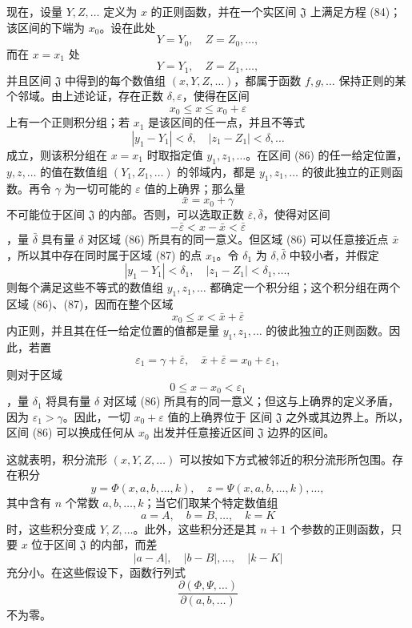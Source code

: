 \documentclass[11pt,a4paper,leqno]{article}
\begin{document}
现在，设量 $Y,Z,\ldots$ 定义为 $x$ 的正则函数，并在一个实区间 $\mathfrak J$ 上满足方程 (84)；该区间的下端为 $x_0$。设在此处
\[
Y=Y_0,\quad Z=Z_0,\ldots,
\]
而在 $x=x_1$ 处
\[
Y=Y_1,\quad Z=Z_1,\ldots,
\]
并且区间 $\mathfrak J$ 中得到的每个数值组 $(x,Y,Z,\ldots)$，都属于函数 $f,g,\ldots$
保持正则的某个邻域。由上述论证，存在正数 $\delta,\varepsilon$，使得在区间
\begin{equation}\tag{86}
x_0\leq x\leq x_0+\varepsilon
\end{equation}
上有一个正则积分组；若 $x_1$ 是该区间的任一点，并且不等式
\[
|y_1-Y_1|<\delta,\quad |z_1-Z_1|<\delta,\ldots
\]
成立，则该积分组在 $x=x_1$ 时取指定值 $y_1,z_1,\ldots$。在区间 (86) 的任一给定位置，$y,z,\ldots$ 的值在数值组 $(Y_1,Z_1,\ldots)$ 的邻域内，都是 $y_1,z_1,\ldots$ 的彼此独立的正则函数。再令 $\gamma$ 为一切可能的 $\varepsilon$ 值的上确界；那么量
\[
\bar x=x_0+\gamma
\]
不可能位于区间 $\mathfrak J$ 的内部。否则，可以选取正数 $\bar\varepsilon,\bar\delta$，使得对区间
\begin{equation}\tag{87}
-\bar\varepsilon<x-\bar x<\bar\varepsilon
\end{equation}
，量 $\bar\delta$ 具有量 $\delta$ 对区域 (86) 所具有的同一意义。但区域 (86) 可以任意接近点 $\bar x$，所以其中存在同时属于区域 (87) 的点 $x_1$。令 $\delta_1$ 为 $\delta,\bar\delta$ 中较小者，并假定
\[
|y_1-Y_1|<\delta_1,\quad |z_1-Z_1|<\delta_1,\ldots,
\]
则每个满足这些不等式的数值组 $y_1,z_1,\ldots$ 都确定一个积分组；这个积分组在两个区域 (86)、(87)，因而在整个区域
\[
x_0\leq x<\bar x+\bar\varepsilon
\]
内正则，并且其在任一给定位置的值都是量 $y_1,z_1,\ldots$ 的彼此独立的正则函数。因此，若置
\[
\varepsilon_1=\gamma+\bar\varepsilon,\quad \bar x+\bar\varepsilon=x_0+\varepsilon_1,
\]
则对于区域
\[
0\leq x-x_0<\varepsilon_1
\]
，量 $\delta_1$ 将具有量 $\delta$ 对区域 (86) 所具有的同一意义；但这与上确界的定义矛盾，因为 $\varepsilon_1>\gamma$。因此，一切 $x_0+\varepsilon$ 值的上确界位于
区间 $\mathfrak J$ 之外或其边界上。所以，区间 (86) 可以换成任何从 $x_0$ 出发并任意接近区间 $\mathfrak J$ 边界的区间。

这就表明，积分流形 $(x,Y,Z,\ldots)$ 可以按如下方式被邻近的积分流形所包围。存在积分
\[
y=\Phi(x,a,b,\ldots,k),\quad z=\Psi(x,a,b,\ldots,k),\ldots,
\]
其中含有 $n$ 个常数 $a,b,\ldots,k$；当它们取某个特定数值组
\[
a=A,\quad b=B,\ldots,\quad k=K
\]
时，这些积分变成 $Y,Z,\ldots$。此外，这些积分还是其 $n+1$ 个参数的正则函数，只要 $x$ 位于区间 $\mathfrak J$ 的内部，而差
\[
|a-A|,\quad |b-B|,\ldots,\quad |k-K|
\]
充分小。在这些假设下，函数行列式
\[
\frac{\partial(\Phi,\Psi,\ldots)}{\partial(a,b,\ldots)}
\]
不为零。
\end{document}

